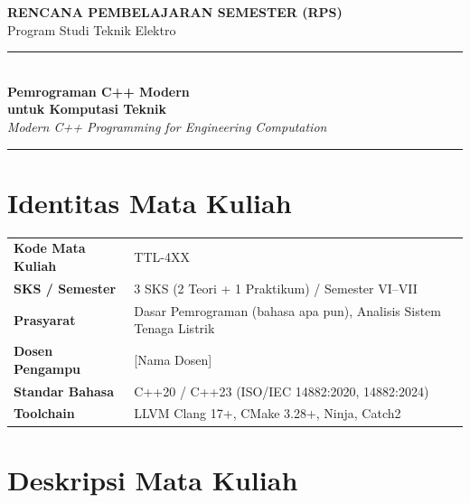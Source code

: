 \documentclass[12pt,a4paper]{article}
\begin{document}
\begin{center}
    {\Large\bfseries\textcolor{uniblue}{RENCANA PEMBELAJARAN SEMESTER (RPS)}}\\[0.3cm]
    {\large Program Studi Teknik Elektro}\\[0.5cm]
    \rule{\textwidth}{1.5pt}\\[0.4cm]
    {\LARGE\bfseries Pemrograman C++ Modern\\untuk Komputasi Teknik}\\[0.2cm]
    {\large\textit{Modern C++ Programming for Engineering Computation}}\\[0.4cm]
    \rule{\textwidth}{1.5pt}
\end{center}

\vspace{0.5cm}

\section*{Identitas Mata Kuliah}

\begin{tabularx}{\textwidth}{@{}lX@{}}
    \toprule
    \textbf{Kode Mata Kuliah}   & TTL-4XX \\
    \textbf{SKS / Semester}     & 3 SKS (2 Teori + 1 Praktikum) / Semester VI--VII \\
    \textbf{Prasyarat}          & Dasar Pemrograman (bahasa apa pun), Analisis Sistem Tenaga Listrik \\
    \textbf{Dosen Pengampu}     & [Nama Dosen] \\
    \textbf{Standar Bahasa}     & C++20 / C++23 (ISO/IEC 14882:2020, 14882:2024) \\
    \textbf{Toolchain}          & LLVM Clang 17+, CMake 3.28+, Ninja, Catch2 \\
    \bottomrule
\end{tabularx}

\section*{Deskripsi Mata Kuliah}
\end{document}
